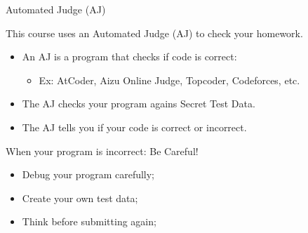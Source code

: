 
\begin{frame}{Automated Judge (AJ)}
  \begin{exampleblock}{}
    This course uses an \alert{Automated Judge (AJ)} to check your homework.
  \end{exampleblock}

  \begin{itemize}
  \item An AJ is a program that checks if code is correct:
    \begin{itemize}
      \item Ex: AtCoder, Aizu Online Judge, Topcoder, Codeforces, etc.
    \end{itemize}\bigskip

  \item The AJ checks your program agains \alert{Secret Test Data}.\bigskip

  \item The AJ tells you if your code is \alert{correct or incorrect}.
  \end{itemize}

  \begin{alertblock}{When your program is incorrect: Be Careful!}
    \begin{itemize}
      \item Debug your program carefully;
      \item Create your own test data;
      \item Think before submitting again;
    \end{itemize}
  \end{alertblock}
\end{frame}

